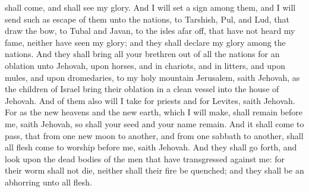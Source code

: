 shall come, and shall see my glory. And I will set a sign among them, and I will send such as escape of them unto the nations, to Tarshish, Pul, and Lud, that draw the bow, to Tubal and Javan, to the isles afar off, that have not heard my fame, neither have seen my glory; and they shall declare my glory among the nations. And they shall bring all your brethren out of all the nations for an oblation unto Jehovah, upon horses, and in chariots, and in litters, and upon mules, and upon dromedaries, to my holy mountain Jerusalem, saith Jehovah, as the children of Israel bring their oblation in a clean vessel into the house of Jehovah. And of them also will I take for priests and for Levites, saith Jehovah.  For as the new heavens and the new earth, which I will make, shall remain before me, saith Jehovah, so shall your seed and your name remain. And it shall come to pass, that from one new moon to another, and from one sabbath to another, shall all flesh come to worship before me, saith Jehovah. And they shall go forth, and look upon the dead bodies of the men that have transgressed against me: for their worm shall not die, neither shall their fire be quenched; and they shall be an abhorring unto all flesh. 